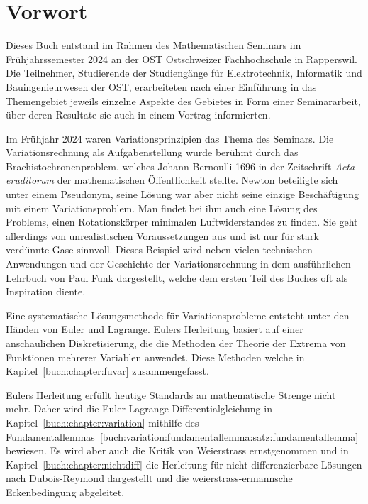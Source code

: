 %
%
%
\chapter*{Vorwort}


Dieses Buch entstand im Rahmen des Mathematischen Seminars
im Frühjahrssemester 2024 an der OST Ostschweizer Fachhochschule in Rapperswil.
Die Teilnehmer, Studierende der Studiengänge für Elektrotechnik, Informatik
und Bauingenieurwesen
der OST, erarbeiteten nach einer Einführung in das Themengebiet jeweils
einzelne Aspekte des Gebietes in Form einer Seminararbeit, über
deren Resultate sie auch in einem Vortrag informierten. 

Im Frühjahr 2024 waren Variationsprinzipien das Thema des Seminars.
Die Variationsrechnung als Aufgabenstellung wurde berühmt durch
das Brachistochronenproblem, welches Johann Bernoulli 1696 in der
Zeitschrift {\em Acta eruditorum} der mathematischen Öffentlichkeit
stellte.
Newton beteiligte sich unter einem Pseudonym, seine Lösung war aber nicht
seine einzige Beschäftigung mit einem Variationsproblem.
Man findet bei ihm auch eine Lösung des Problems, einen Rotationskörper
minimalen Luftwiderstandes zu finden.
Sie geht allerdings von unrealistischen Voraussetzungen aus und ist
nur für stark verdünnte Gase sinnvoll.
Dieses Beispiel wird neben vielen technischen Anwendungen und 
der Geschichte der Variationsrechnung in dem ausführlichen Lehrbuch
\cite{buch:funk} von Paul Funk dargestellt, welche dem ersten Teil
des Buches oft als Inspiration diente.

Eine systematische Lösungsmethode für Variationsprobleme entsteht unter
den Händen von Euler und Lagrange.
Eulers Herleitung basiert auf einer anschaulichen Diskretisierung,
die die Methoden der Theorie der Extrema von Funktionen mehrerer
Variablen anwendet.
Diese Methoden welche in Kapitel~\ref{buch:chapter:fuvar}
zusammengefasst.

Eulers Herleitung erfüllt heutige Standards an mathematische
Strenge nicht mehr.
Daher wird die Euler-Lagrange-Differentialgleichung in
Kapitel~\ref{buch:chapter:variation} mithilfe des
Fundamentallemmas~\ref{buch:variation:fundamentallemma:satz:fundamentallemma}
bewiesen.
Es wird aber auch die Kritik von Weierstrass ernstgenommen und
in Kapitel~\ref{buch:chapter:nichtdiff} die
Herleitung für nicht differenzierbare Lösungen nach Dubois-Reymond
dargestellt und die weierstrass-ermannsche Eckenbedingung abgeleitet.

